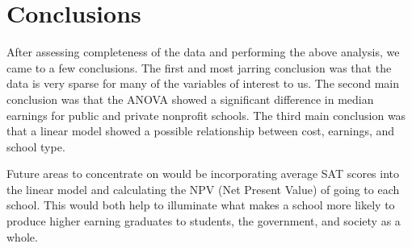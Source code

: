 \documentclass[%
 reprint,
 amsmath,amssymb,
 aps,
]{revtex4-1}
\begin{document}
\section{\label{sec:level1}Conclusions}
After assessing completeness of the data and performing the above analysis, we came to a few conclusions.  The first and most jarring conclusion was that the data is very sparse for many of the variables of interest to us.  The second main conclusion was that the ANOVA showed a significant difference in median earnings for public and private nonprofit schools.  The third main conclusion was that a linear model showed a possible relationship between cost, earnings, and school type.

Future areas to concentrate on would be incorporating average SAT scores into the linear model and calculating the NPV (Net Present Value) of going to each school.  This would both help to illuminate what makes a school more likely to produce higher earning graduates to students, the government, and society as a whole.
\end{document}
